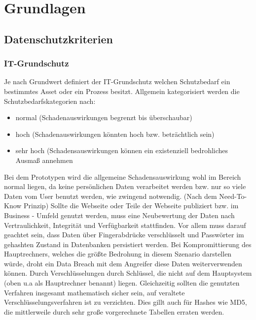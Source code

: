 \chapter{Grundlagen}

\section{Datenschutzkriterien}
\subsection{IT-Grundschutz}
Je nach Grundwert definiert der IT-Grundschutz welchen Schutzbedarf ein bestimmtes Asset oder ein Prozess besitzt. Allgemein kategorisiert werden die Schutzbedarfskategorien nach:
\begin{itemize} 
\item normal (Schadenauswirkungen begrenzt bis überschaubar)
\item hoch (Schadenauswirkungen könnten hoch bzw. beträchtlich sein)
\item sehr hoch (Schadensauswirkungen können ein existenziell bedrohliches Ausmaß annehmen
\end{itemize}
Bei dem Prototypen wird die allgemeine Schadensauswirkung wohl im Bereich normal liegen, da keine persönlichen Daten verarbeitet werden bzw. nur so viele Daten vom User benutzt werden, wie zwingend notwendig. (Nach dem Need-To-Know Prinzip) Sollte die Webseite oder Teile der Webseite publiziert bzw. im Business - Umfeld genutzt werden, muss eine Neubewertung der Daten nach Vertraulichkeit, Integrität und Verfügbarkeit stattfinden. Vor allem muss darauf geachtet sein, dass Daten über Fingerabdrücke verschlüsselt und Passwörter im gehashten Zustand in Datenbanken persistiert werden. Bei Kompromittierung des Hauptrechners, welches die größte Bedrohung in diesem Szenario darstellen würde, droht ein Data Breach mit dem Angreifer diese Daten weiterverwenden können. Durch Verschlüsselungen durch Schlüssel, die nicht auf dem Hauptsystem (oben u.a als Hauptrechner benannt) liegen. Gleichzeitig sollten die genutzten Verfahren insgesamt mathematisch sicher sein, auf veraltete Verschlüsselungsverfahren ist zu verzichten. Dies gillt auch für Hashes wie MD5, die mittlerweile durch sehr große vorgerechnete Tabellen erraten werden. \\\\
